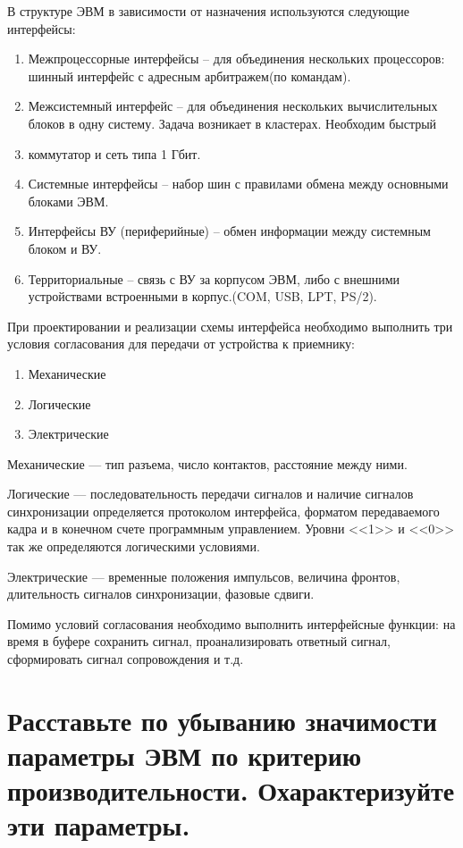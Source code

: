 \documentclass[unicode, 12pt, a4paper, oneside]{article}
\begin{document}
В структуре ЭВМ в зависимости от назначения используются следующие интерфейсы:
\begin{enumerate}
\item Межпроцессорные интерфейсы – для объединения нескольких процессоров: шинный интерфейс с адресным арбитражем(по командам).
\item Межсистемный интерфейс – для объединения нескольких вычислительных блоков в одну систему. Задача возникает в кластерах. Необходим быстрый \item коммутатор и сеть типа 1 Гбит.
\item Системные интерфейсы – набор шин с правилами обмена между основными блоками ЭВМ.
\item Интерфейсы ВУ (периферийные) – обмен информации между системным блоком и ВУ.
\item Территориальные – связь с ВУ за корпусом ЭВМ, либо с внешними устройствами встроенными в корпус.(COM, USB, LPT, PS/2).
\end{enumerate}

При проектировании и реализации схемы интерфейса необходимо выполнить три условия согласования для передачи от устройства к приемнику:
\begin{enumerate}
\item Механические
\item Логические
\item Электрические
\end{enumerate}

Механические --- тип разъема, число контактов, расстояние между ними.

Логические --- последовательность передачи сигналов и наличие сигналов синхронизации определяется протоколом интерфейса, форматом передаваемого кадра и в конечном счете программным управлением. Уровни <<1>> и <<0>> так же определяются логическими условиями.

Электрические --- временные положения импульсов, величина фронтов, длительность сигналов синхронизации, фазовые сдвиги.

Помимо условий согласования необходимо выполнить интерфейсные функции: на время в буфере сохранить сигнал, проанализировать ответный сигнал, сформировать сигнал сопровождения и т.д.

\section{Расставьте по убыванию значимости параметры ЭВМ по критерию производительности. Охарактеризуйте эти параметры.}
\end{document}
